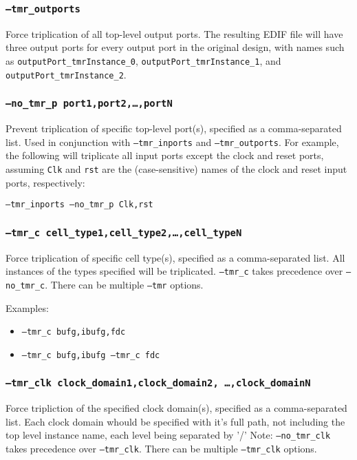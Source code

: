 \subsubsection{\texttt{--tmr\_outports}}
Force triplication of all top-level output ports. The resulting EDIF file will
have three output ports for every output port in the original design, with names 
such as \texttt{outputPort\_tmrInstance\_0}, 
\texttt{output\-Port\_tmr\-Instance\_1}, and 
\texttt{outputPort\_tmrInstance\_2}.

\subsubsection{\texttt{--no\_tmr\_p port1,port2,\ldots,portN}}
Prevent triplication of specific top-level port(s), specified as a 
comma-separated list. Used in conjunction with \texttt{--tmr\_inports} and 
\texttt{--tmr\_outports}. For example, the following will triplicate all input 
ports except the clock and reset ports, assuming \texttt{Clk} and \texttt{rst} 
are the (case-sensitive) names of the clock and reset input ports, respectively:

\texttt{--tmr\_inports --no\_tmr\_p Clk,rst} 

\subsubsection{\texttt{--tmr\_c cell\_type1,cell\_type2,\ldots,cell\_typeN}}
Force triplication of specific cell type(s), specified as a comma-separated list. 
All instances of the types specified will be triplicated. \texttt{--tmr\_c}
takes precedence over \texttt{--no\_tmr\_c}. There can be multiple 
\texttt{--tmr} options.

Examples: 
\begin{itemize}
\item \texttt{--tmr\_c bufg,ibufg,fdc}
\item \texttt{--tmr\_c bufg,ibufg --tmr\_c fdc}
\end{itemize}

\subsubsection{\texttt{--tmr\_clk clock\_domain1,clock\_domain2,
\ldots,clock\_domainN}}
Force tripliction of the specified clock domain(s), specified as a comma-separated
list. Each clock domain whould be specified with it's full path, not including
the top level instance name, each level being separated by '/' Note:
\texttt{--no\_tmr\_clk} takes precedence over \texttt{--tmr\_clk}. There can be
multiple \texttt{--tmr\_clk} options.



